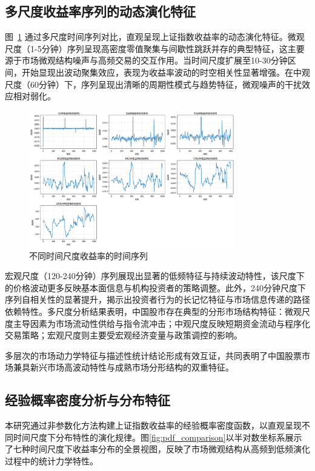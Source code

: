 \documentclass[12pt, a4paper]{article}
\begin{document}
\subsection{多尺度收益率序列的动态演化特征}

图~\ref{fig:returns_timeseries} 通过多尺度时间序列对比，直观呈现上证指数收益率的动态演化特征。微观尺度（1-5分钟）序列呈现高密度零值聚集与间歇性跳跃并存的典型特征，这主要源于市场微观结构噪声与高频交易的交互作用。当时间尺度扩展至10-30分钟区间，开始显现出波动聚集效应，表现为收益率波动的时空相关性显著增强。在中观尺度（60分钟）下，序列呈现出清晰的周期性模式与趋势特征，微观噪声的干扰效应相对弱化。

\begin{figure}[htbp]
\centering
\includegraphics[width=0.8\textwidth]{../assets/img/收益率时间序列.png}
\caption{不同时间尺度收益率的时间序列}
\label{fig:returns_timeseries}
\end{figure}

宏观尺度（120-240分钟）序列展现出显著的低频特征与持续波动特性，该尺度下的价格波动更多反映基本面信息与机构投资者的策略调整。此外，240分钟尺度下序列自相关性的显著提升，揭示出投资者行为的长记忆特征与市场信息传递的路径依赖特性。多尺度分析结果表明，中国股市存在典型的分形市场结构特征：微观尺度主导因素为市场流动性供给与指令流冲击；中观尺度反映短期资金流动与程序化交易策略；宏观尺度则主要受宏观经济变量与政策调控的影响。

多层次的市场动力学特征与描述性统计结论形成有效互证，共同表明了中国股票市场兼具新兴市场高波动特性与成熟市场分形结构的双重特征。

\subsection{经验概率密度分析与分布特征}

本研究通过非参数化方法构建上证指数收益率的经验概率密度函数，以直观呈现不同时间尺度下分布特性的演化规律。图\ref{fig:pdf_comparison}以半对数坐标系展示了七种时间尺度下收益率分布的全景视图，反映了市场微观结构从高频到低频演化过程中的统计力学特性。
\end{document}
